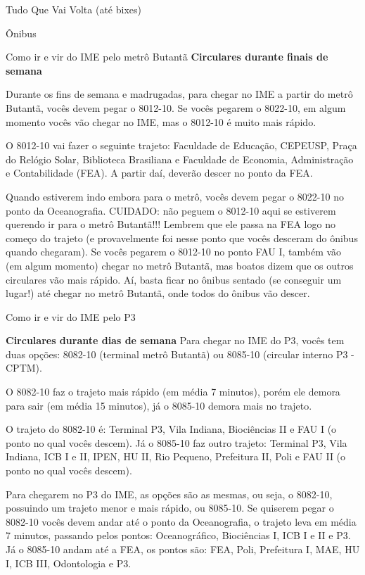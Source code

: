 \begin{secao}{Tudo Que Vai Volta (até bixes)}
\begin{subsecao}{Ônibus}
\begin{subsubsecao}{Como ir e vir do IME pelo metrô Butantã}
{\bf Circulares durante finais de semana}

Durante os fins de semana e madrugadas, para chegar no IME 
a partir do metrô Butantã, vocês devem pegar o 8012-10. 
Se vocês pegarem o 8022-10, em algum momento vocês 
vão chegar no IME, mas o 8012-10 é muito mais rápido.

O 8012-10 vai fazer o seguinte trajeto: Faculdade de Educação, CEPEUSP,
Praça do Relógio Solar, Biblioteca Brasiliana e Faculdade de Economia,
Administração e Contabilidade (FEA). A partir daí, deverão descer no ponto da
FEA.

Quando estiverem indo embora para o metrô, vocês devem pegar o 8022-10
no ponto da Oceanografia. CUIDADO: não peguem o 8012-10 aqui
se estiverem querendo ir para o metrô Butantã!!! Lembrem que ele passa na
FEA logo no começo do trajeto (e provavelmente foi nesse ponto que vocês
desceram do ônibus quando chegaram). Se vocês pegarem o 8012-10
no ponto FAU I, também vão (em algum momento) chegar no metrô Butantã, mas
boatos dizem que os outros circulares vão mais rápido. Aí, basta ficar no
ônibus sentado (se conseguir um lugar!) até chegar no metrô Butantã, onde 
todos do ônibus vão descer.

\end{subsubsecao}

\begin{subsubsecao}{Como ir e vir do IME pelo P3}

{\bf Circulares durante dias de semana}
Para chegar no IME do P3, vocês tem duas opções: 8082-10 (terminal metrô 
Butantã) ou 8085-10 (circular interno P3 - CPTM). 

O 8082-10 faz o trajeto mais rápido (em média 7 minutos), porém ele demora para sair 
(em média 15 minutos), já o 8085-10 demora mais no trajeto.

O trajeto do 8082-10 é: Terminal P3, Vila Indiana, Biociências II e FAU I
(o ponto no qual vocês descem). Já o 8085-10 faz outro trajeto: Terminal P3,
Vila Indiana, ICB I e II, IPEN, HU II, Rio Pequeno, Prefeitura II, Poli e FAU II
(o ponto no qual vocês descem).

Para chegarem no P3 do IME, as opções são as mesmas, ou seja, o 8082-10, possuindo 
um trajeto menor e mais rápido, ou 8085-10. Se quiserem pegar o 8082-10 vocês 
devem andar até o ponto da Oceanografia, o trajeto leva em média 7 minutos, 
passando pelos pontos: Oceanográfico, Biociências I, ICB I e II e P3. 
Já o 8085-10 andam até a FEA, os pontos são: FEA, Poli, Prefeitura I, MAE, 
HU I, ICB III, Odontologia e P3.


\end{subsubsecao}
\end{subsecao}
\end{secao}
